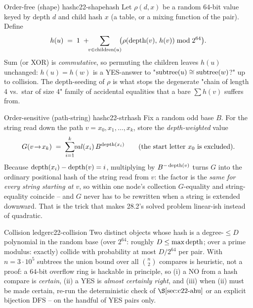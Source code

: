 \begin{definition}{Order-free (shape) hash}{c22-shapehash}
Let \(\rho(d, x)\) be a random \(64\)-bit value keyed by depth \(d\) and child hash
\(x\) (a table, or a mixing function of the pair).  Define
\[
   h(u) \;=\; 1 \;+\!\! \sum_{v \in \operatorname{children}(u)}\!\!\bigl(\rho(\operatorname{depth}(v),\, h(v)) \bmod 2^{64}\bigr) .
\]
Sum (or XOR) is \emph{commutative}, so permuting the children leaves \(h(u)\)
unchanged: \(h(u)=h(w)\) is a YES-answer to "\(\operatorname{subtree}(u)\cong\operatorname{subtree}(w)\)?" up
to collision.  The depth-seeding of \(\rho\) is what stops the degenerate
"chain of length 4 vs.\ star of size 4" family of accidental equalities that a
bare \(\sum h(v)\) suffers from.
\end{definition}

\begin{definition}{Order-sensitive (path-string) hash}{c22-strhash}
Fix a random odd base \(B\).  For the string read down the path
\(v=x_0,x_1,\dots,x_k\), store the \emph{depth-weighted} value
\[
   G(v\!\to\!x_k)\;=\;\sum_{i=1}^{k} \!\!\mathit{val}(x_i)\, B^{\operatorname{depth}(x_i)}
   \qquad(\text{the start letter } x_0 \text{ is excluded}).
\]
Because \(\operatorname{depth}(x_i)-\operatorname{depth}(v)=i\), multiplying by \(B^{-\operatorname{depth}(v)}\) turns \(G\)
into the ordinary positional hash of the string read from \(v\): the factor is the
\emph{same for every string starting at \(v\)}, so within one node's collection
\(G\)-equality and string-equality coincide -- and \(G\) never has to be rewritten
when a string is extended downward.  That is the trick that makes 28.2's solved
problem linear-ish instead of quadratic.
\end{definition}

\begin{theorem}{Collision ledger}{c22-collision}
Two distinct objects whose hash is a degree-\(\le D\) polynomial in the random
base (over \(2^{64}\): roughly \(D\le\max\operatorname{depth}\); over a prime modulus: exactly)
collide with probability at most \(D/2^{64}\) per pair.  With \(n=3\cdot10^{5}\)
subtrees the union bound over all \(\binom{n}{2}\) compares is heuristic, not a
proof: a \(64\)-bit overflow ring is hackable in principle, so (i) a NO from a hash
compare is \emph{certain}, (ii) a YES is \emph{almost certainly right}, and (iii)
when (ii) must be made certain, re-run the deterministic check of
\(\secref{c22-ahu}\) or an explicit bijection DFS -- on the handful of YES pairs
only.
\end{theorem}


